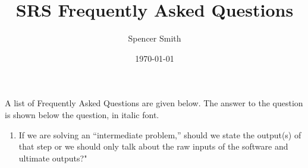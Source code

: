 \documentclass[12pt]{article}
\begin{document}
\title{SRS Frequently Asked Questions}
\author{Spencer Smith}
\date{\today}

\maketitle

A list of Frequently Asked Questions are given below.  The answer to the
question is shown below the question, in italic font.

\begin{enumerate}

\item If we are solving an ``intermediate problem,'' should we state the
  output(s) of that step or we should only talk about the raw inputs of the
  software and ultimate outputs?" \medskip


\end{enumerate}
\end{document}
